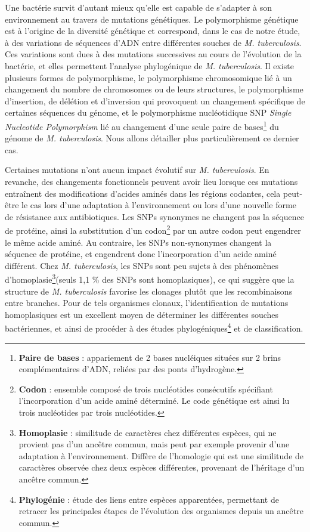 \documentclass[twoside,a4paper,11pt,frenchb,openany]{report}
\begin{document}
Une bactérie survit d'autant mieux qu'elle est capable de s'adapter à son environnement au travers de mutations génétiques. Le polymorphisme génétique est à l'origine de la diversité génétique et correspond, dans le cas de notre étude, à des variations de séquences d'ADN entre différentes souches de \textit{M. tuberculosis}. Ces variations sont dues à des mutations successives au cours de l'évolution de la bactérie, et elles permettent l'analyse phylogénique de \textit{M. tuberculosis}. Il existe plusieurs formes de polymorphisme, le polymorphisme chromosomique lié à un changement du nombre de chromosomes ou de leurs structures, le polymorphisme d'insertion, de délétion et d'inversion qui provoquent un changement spécifique de certaines séquences du génome, et le polymorphisme nucléotidique SNP \textit{Single Nucleotide Polymorphism} lié au changement d'une seule paire de bases\footnote{\textbf{Paire de bases} : appariement de 2 bases nucléiques situées sur 2 brins complémentaires d'ADN, reliées par des ponts d'hydrogène.} du génome de \textit{M. tuberculosis}. Nous allons détailler plus particulièrement ce dernier cas.

Certaines mutations n'ont aucun impact évolutif sur \textit{M. tuberculosis}. En revanche, des changements fonctionnels peuvent avoir lieu lorsque ces mutations entraînent des modifications d'acides aminés dans les régions codantes, cela peut-être le cas lors d'une adaptation à l'environnement ou lors d'une nouvelle forme de résistance aux antibiotiques. Les SNPs synonymes ne changent pas la séquence de protéine, ainsi la substitution d'un codon\footnote{\textbf{Codon} : ensemble composé de trois nucléotides consécutifs spécifiant l'incorporation d'un acide aminé déterminé. Le code génétique est ainsi lu trois nucléotides par trois nucléotides.} par un autre codon peut engendrer le même acide aminé. Au contraire, les SNPs non-synonymes changent la séquence de protéine, et engendrent donc l'incorporation d'un acide aminé différent. Chez \textit{M. tuberculosis}, les SNPs sont peu sujets à des phénomènes d'homoplasie\footnote{\textbf{Homoplasie} : similitude de caractères chez différentes espèces, qui ne provient pas d'un ancêtre commun, mais peut par exemple provenir d'une adaptation à l'environnement. Diffère de l'homologie qui est une similitude de caractères observée chez deux espèces différentes, provenant de l'héritage d'un ancêtre commun.}(seuls 1,1 \% des SNPs sont homoplasiques), ce qui suggère que la structure de \textit{M. tuberculosis} favorise les clonages plutôt que les recombinaisons entre branches. Pour de tels organismes clonaux, l'identification de mutations homoplasiques est un excellent moyen de déterminer les différentes souches bactériennes, et ainsi de procéder à des études phylogéniques\footnote{\textbf{Phylogénie} : étude des liens entre espèces apparentées, permettant de retracer les principales étapes de l'évolution des organismes depuis un ancêtre commun.} et de classification.
\end{document}
